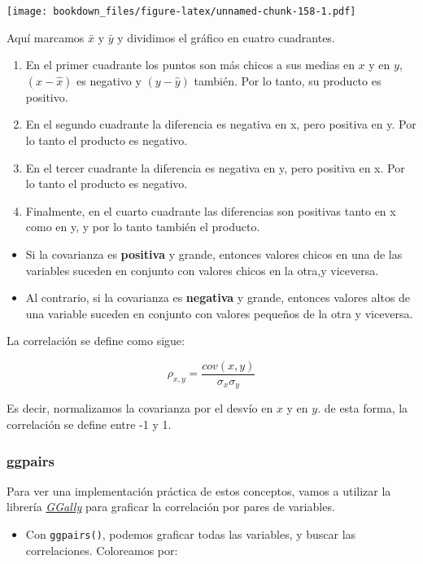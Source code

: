 \documentclass[]{book}
\providecommand{\tightlist}{%
  \setlength{\itemsep}{0pt}\setlength{\parskip}{0pt}}
\begin{document}
\texttt{[image: bookdown\_files/figure-latex/unnamed-chunk-158-1.pdf]}

Aquí marcamos \(\bar x\) y \(\bar y\) y dividimos el gráfico en cuatro cuadrantes.

\begin{enumerate}
\def\labelenumi{\arabic{enumi}.}
\tightlist
\item
  En el primer cuadrante los puntos son más chicos a sus medias en \(x\) y en \(y\), \((x-\hat x)\) es negativo y \((y-\hat y)\) también. Por lo tanto, su producto es positivo.
\item
  En el segundo cuadrante la diferencia es negativa en x, pero positiva en y. Por lo tanto el producto es negativo.
\item
  En el tercer cuadrante la diferencia es negativa en y, pero positiva en x. Por lo tanto el producto es negativo.
\item
  Finalmente, en el cuarto cuadrante las diferencias son positivas tanto en x como en y, y por lo tanto también el producto.
\end{enumerate}

\begin{itemize}
\tightlist
\item
  Si la covarianza es \textbf{positiva} y grande, entonces valores chicos en una de las variables suceden en conjunto con valores chicos en la otra,y viceversa.
\item
  Al contrario, si la covarianza es \textbf{negativa} y grande, entonces valores altos de una variable suceden en conjunto con valores pequeños de la otra y viceversa.
\end{itemize}

La correlación se define como sigue:

\[\rho_{x,y}=\frac{cov(x,y)}{\sigma_x \sigma_y}\]

Es decir, normalizamos la covarianza por el desvío en \(x\) y en \(y\). de esta forma, la correlación se define entre -1 y 1.

\hypertarget{ggpairs}{%
\subsubsection{ggpairs}\label{ggpairs}}

Para ver una implementación práctica de estos conceptos, vamos a utilizar la librería \href{https://ggobi.github.io/ggally/}{\emph{GGally}} para graficar la correlación por pares de variables.

\begin{itemize}
\tightlist
\item
  Con \texttt{ggpairs()}, podemos graficar todas las variables, y buscar las correlaciones. Coloreamos por:
\end{itemize}
\end{document}
